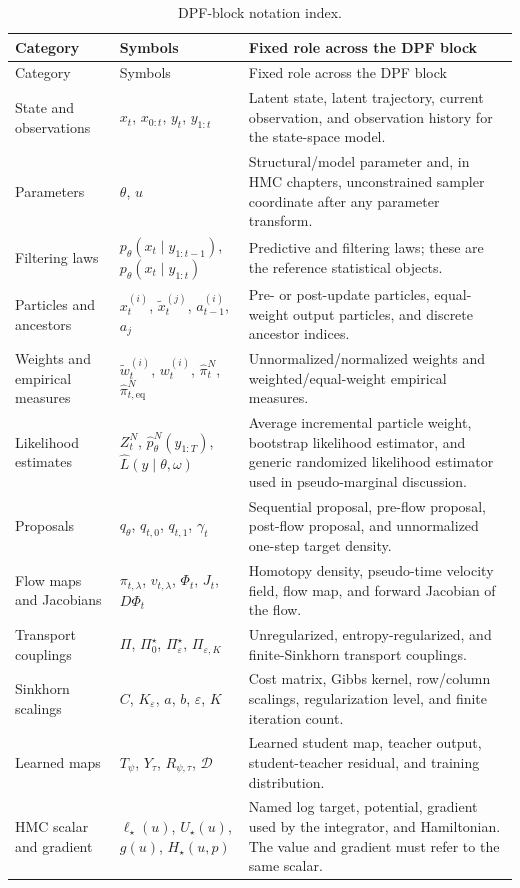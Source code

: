 \begin{center}
\scriptsize
\begin{longtable}{@{}p{} p{} p{}@{}}
\caption{DPF-block notation index.}
\label{tab:bf-dpf-notation-index}\\
\toprule
Category & Symbols & Fixed role across the DPF block \\
\midrule
\endfirsthead
\toprule
Category & Symbols & Fixed role across the DPF block \\
\midrule
\endhead
State and observations &
$x_t$, $x_{0:t}$, $y_t$, $y_{1:t}$ &
Latent state, latent trajectory, current observation, and observation history
for the state-space model. \\
Parameters &
$\theta$, $u$ &
Structural/model parameter and, in HMC chapters, unconstrained sampler
coordinate after any parameter transform. \\
Filtering laws &
$p_\theta(x_t\mid y_{1:t-1})$, $p_\theta(x_t\mid y_{1:t})$ &
Predictive and filtering laws; these are the reference statistical objects. \\
Particles and ancestors &
$x_t^{(i)}$, $\tilde x_t^{(j)}$, $a_{t-1}^{(i)}$, $a_j$ &
Pre- or post-update particles, equal-weight output particles, and discrete
ancestor indices. \\
Weights and empirical measures &
$\tilde w_t^{(i)}$, $w_t^{(i)}$, $\hat\pi_t^N$, $\hat\pi_{t,\mathrm{eq}}^N$ &
Unnormalized/normalized weights and weighted/equal-weight empirical measures. \\
Likelihood estimates &
$Z_t^N$, $\hat p_\theta^N(y_{1:T})$, $\widehat L(y\mid\theta,\omega)$ &
Average incremental particle weight, bootstrap likelihood estimator, and
generic randomized likelihood estimator used in pseudo-marginal discussion. \\
Proposals &
$q_\theta$, $q_{t,0}$, $q_{t,1}$, $\gamma_t$ &
Sequential proposal, pre-flow proposal, post-flow proposal, and unnormalized
one-step target density. \\
Flow maps and Jacobians &
$\pi_{t,\lambda}$, $v_{t,\lambda}$, $\Phi_t$, $J_t$, $D\Phi_t$ &
Homotopy density, pseudo-time velocity field, flow map, and forward Jacobian of
the flow. \\
Transport couplings &
$\Pi$, $\Pi_0^\star$, $\Pi_\varepsilon^\star$, $\Pi_{\varepsilon,K}$ &
Unregularized, entropy-regularized, and finite-Sinkhorn transport couplings. \\
Sinkhorn scalings &
$C$, $K_\varepsilon$, $a$, $b$, $\varepsilon$, $K$ &
Cost matrix, Gibbs kernel, row/column scalings, regularization level, and
finite iteration count. \\
Learned maps &
$T_\psi$, $Y_\tau$, $R_{\psi,\tau}$, $\mathcal D$ &
Learned student map, teacher output, student-teacher residual, and training
distribution. \\
HMC scalar and gradient &
$\ell_\star(u)$, $U_\star(u)$, $g(u)$, $H_\star(u,p)$ &
Named log target, potential, gradient used by the integrator, and Hamiltonian.
The value and gradient must refer to the same scalar. \\
\bottomrule
\end{longtable}
\end{center}

